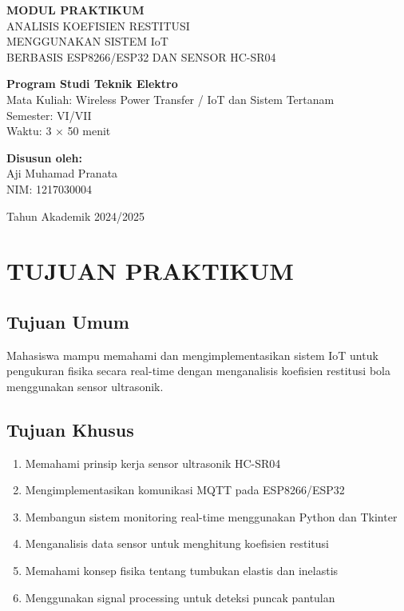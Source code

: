 \documentclass[12pt,a4paper]{article}
\begin{document}
\begin{titlepage}
    \centering
    \vspace*{2cm}
    
    {\huge\bfseries MODUL PRAKTIKUM\\[0.5cm]}
    {\Large ANALISIS KOEFISIEN RESTITUSI\\MENGGUNAKAN SISTEM IoT\\[0.3cm]}
    {\large BERBASIS ESP8266/ESP32 DAN SENSOR HC-SR04\\[2cm]}
    
    
    {\large\bfseries Program Studi Teknik Elektro\\[0.5cm]}
    {\large Mata Kuliah: Wireless Power Transfer / IoT dan Sistem Tertanam\\[0.3cm]}
    {\large Semester: VI/VII\\[0.3cm]}
    {\large Waktu: 3 × 50 menit\\[2cm]}
    
    {\large\bfseries Disusun oleh:\\[0.5cm]}
    {\large Aji Muhamad Pranata\\[0.2cm]}
    {\large NIM: 1217030004\\[3cm]}
    
    {\large Tahun Akademik 2024/2025}
    
\end{titlepage}

\newpage
\tableofcontents
\newpage

\section{TUJUAN PRAKTIKUM}

\subsection{Tujuan Umum}
Mahasiswa mampu memahami dan mengimplementasikan sistem IoT untuk pengukuran fisika secara real-time dengan menganalisis koefisien restitusi bola menggunakan sensor ultrasonik.

\subsection{Tujuan Khusus}
\begin{enumerate}
    \item Memahami prinsip kerja sensor ultrasonik HC-SR04
    \item Mengimplementasikan komunikasi MQTT pada ESP8266/ESP32
    \item Membangun sistem monitoring real-time menggunakan Python dan Tkinter
    \item Menganalisis data sensor untuk menghitung koefisien restitusi
    \item Memahami konsep fisika tentang tumbukan elastis dan inelastis
    \item Menggunakan signal processing untuk deteksi puncak pantulan
\end{enumerate}
\end{document}
